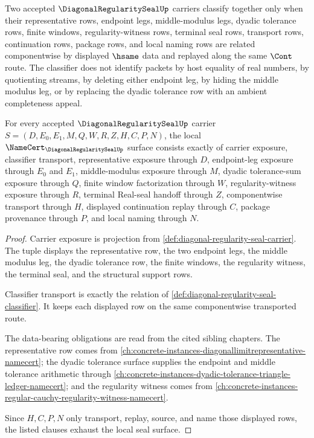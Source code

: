 \begin{definition}
\label{def:diagonal-regularity-seal-classifier}
Two accepted $\DiagonalRegularitySealUp$ carriers classify together only when their representative rows, endpoint legs, middle-modulus legs, dyadic tolerance rows, finite windows, regularity-witness rows, terminal seal rows, transport rows, continuation rows, package rows, and local naming rows are related componentwise by displayed $\hsame$ data and replayed along the same $\Cont$ route. The classifier does not identify packets by host equality of real numbers, by quotienting streams, by deleting either endpoint leg, by hiding the middle modulus leg, or by replacing the dyadic tolerance row with an ambient completeness appeal.
\end{definition}

\begin{theorem}
\label{thm:diagonal-regularity-seal-obligations}
For every accepted $\DiagonalRegularitySealUp$ carrier $S=(D,E_0,E_1,M,Q,W,R,Z,H,C,P,N)$, the local $\NameCert_{\DiagonalRegularitySealUp}$ surface consists exactly of carrier exposure, classifier transport, representative exposure through $D$, endpoint-leg exposure through $E_0$ and $E_1$, middle-modulus exposure through $M$, dyadic tolerance-sum exposure through $Q$, finite window factorization through $W$, regularity-witness exposure through $R$, terminal Real-seal handoff through $Z$, componentwise transport through $H$, displayed continuation replay through $C$, package provenance through $P$, and local naming through $N$.
\end{theorem}
\begin{proof}
Carrier exposure is projection from \autoref{def:diagonal-regularity-seal-carrier}. The tuple displays the representative row, the two endpoint legs, the middle modulus leg, the dyadic tolerance row, the finite windows, the regularity witness, the terminal seal, and the structural support rows.

Classifier transport is exactly the relation of \autoref{def:diagonal-regularity-seal-classifier}. It keeps each displayed row on the same componentwise transported route.

The data-bearing obligations are read from the cited sibling chapters. The representative row comes from \autoref{ch:concrete-instances-diagonallimitrepresentative-namecert}; the dyadic tolerance surface supplies the endpoint and middle tolerance arithmetic through \autoref{ch:concrete-instances-dyadic-tolerance-triangle-ledger-namecert}; and the regularity witness comes from \autoref{ch:concrete-instances-regular-cauchy-regularity-witness-namecert}.

Since $H,C,P,N$ only transport, replay, source, and name those displayed rows, the listed clauses exhaust the local seal surface.
\end{proof}

